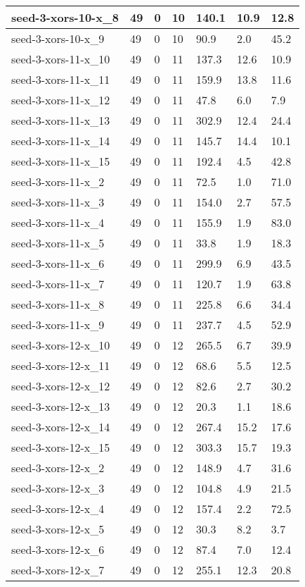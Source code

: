 \begin{scriptsize}
\begin{longtable}{|p{5cm}|l|l|l|l|l|l|}
seed-3-xors-10-x\_8&49&0&10&140.1&10.9&12.8 \\ \hline 
seed-3-xors-10-x\_9&49&0&10&90.9&2.0&45.2 \\ \hline 
seed-3-xors-11-x\_10&49&0&11&137.3&12.6&10.9 \\ \hline 
seed-3-xors-11-x\_11&49&0&11&159.9&13.8&11.6 \\ \hline 
seed-3-xors-11-x\_12&49&0&11&47.8&6.0&7.9 \\ \hline 
seed-3-xors-11-x\_13&49&0&11&302.9&12.4&24.4 \\ \hline 
seed-3-xors-11-x\_14&49&0&11&145.7&14.4&10.1 \\ \hline 
seed-3-xors-11-x\_15&49&0&11&192.4&4.5&42.8 \\ \hline 
seed-3-xors-11-x\_2&49&0&11&72.5&1.0&71.0 \\ \hline 
seed-3-xors-11-x\_3&49&0&11&154.0&2.7&57.5 \\ \hline 
seed-3-xors-11-x\_4&49&0&11&155.9&1.9&83.0 \\ \hline 
seed-3-xors-11-x\_5&49&0&11&33.8&1.9&18.3 \\ \hline 
seed-3-xors-11-x\_6&49&0&11&299.9&6.9&43.5 \\ \hline 
seed-3-xors-11-x\_7&49&0&11&120.7&1.9&63.8 \\ \hline 
seed-3-xors-11-x\_8&49&0&11&225.8&6.6&34.4 \\ \hline 
seed-3-xors-11-x\_9&49&0&11&237.7&4.5&52.9 \\ \hline 
seed-3-xors-12-x\_10&49&0&12&265.5&6.7&39.9 \\ \hline 
seed-3-xors-12-x\_11&49&0&12&68.6&5.5&12.5 \\ \hline 
seed-3-xors-12-x\_12&49&0&12&82.6&2.7&30.2 \\ \hline 
seed-3-xors-12-x\_13&49&0&12&20.3&1.1&18.6 \\ \hline 
seed-3-xors-12-x\_14&49&0&12&267.4&15.2&17.6 \\ \hline 
seed-3-xors-12-x\_15&49&0&12&303.3&15.7&19.3 \\ \hline 
seed-3-xors-12-x\_2&49&0&12&148.9&4.7&31.6 \\ \hline 
seed-3-xors-12-x\_3&49&0&12&104.8&4.9&21.5 \\ \hline 
seed-3-xors-12-x\_4&49&0&12&157.4&2.2&72.5 \\ \hline 
seed-3-xors-12-x\_5&49&0&12&30.3&8.2&3.7 \\ \hline 
seed-3-xors-12-x\_6&49&0&12&87.4&7.0&12.4 \\ \hline 
seed-3-xors-12-x\_7&49&0&12&255.1&12.3&20.8 \\ \hline 

\end{longtable}
\end{scriptsize}
